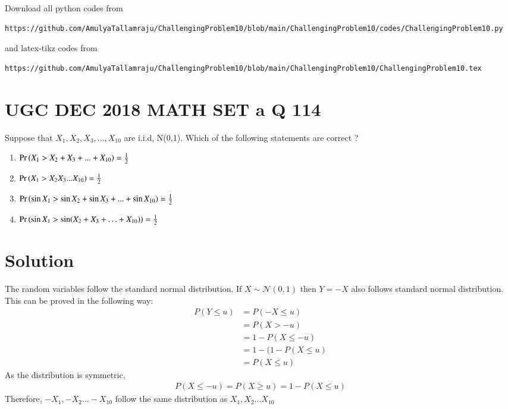 \documentclass[journal,12pt,twocolumn]{IEEEtran}
\begin{document}
\author{Amulya Tallamraju - AI20BTECH11003}
\maketitle
\newpage
\bigskip
\renewcommand{\thefigure}{\theenumi}
\renewcommand{\thetable}{\theenumi}
\newcommand*{\permcomb}[4][0mu]{{{}^{#3}\mkern#1#2_{#4}}}
\newcommand*{\perm}[1][-3mu]{\permcomb[#1]{P}}
\newcommand*{\comb}[1][-1mu]{\permcomb[#1]{C}}
Download all python codes from 
\begin{lstlisting}
https://github.com/AmulyaTallamraju/ChallengingProblem10/blob/main/ChallengingProblem10/codes/ChallengingProblem10.py
\end{lstlisting}
%
and latex-tikz codes from 
%
\begin{lstlisting}
https://github.com/AmulyaTallamraju/ChallengingProblem10/blob/main/ChallengingProblem10/ChallengingProblem10.tex
\end{lstlisting}
\section*{UGC DEC 2018 MATH SET a Q 114}
Suppose that $X_1,X_2,X_3,...,X_{10}$ are i.i.d, N(0,1). Which of the following statements are correct ?
\begin{enumerate}[label = (\Alph*)]
    \item $\Pr\left(X_1>X_2+X_3+...+X_{10}\right)=\frac{1}{2}$
    \item $\Pr\left(X_1>X_2X_3...X_{10}\right)=\frac{1}{2}$
    \item $\Pr\left(\sin{X_1}>\sin{X_2}+\sin{X_3}+...+\sin{X_{10}}\right)=\frac{1}{2}$
    \item $\Pr\left(\sin{X_1}>\sin({X_2+X_3+\ldots+X_{10}})\right)=\frac{1}{2}$
\end{enumerate}
\section*{Solution}
The random variables follow the standard normal distribution. If $X \sim \mathcal{N}(0,1)$ then $Y =-X$ also follows standard normal distribution. This can be proved in the following way:
\begin{align}
    P(Y \leq u) &= P(-X \leq u) \\
    &= P(X > -u) \\
    &= 1 - P(X \leq -u) \\
    &= 1 - (1 - P(X \leq u) \\
    &= P(X \leq u) 
\end{align}
As the distribution is symmetric, \begin{align}
 P(X\leq -u)=P(X\geq u)= 1-P(X\leq u)   
\end{align} 
Therefore, $-X_1,-X_2 ... -X_{10}$ follow the same distribution as $X_1,X_2...X_{10}$
\end{document}
